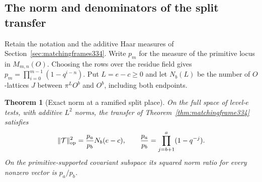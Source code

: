 \documentclass[a4paper,11pt]{article}
\newtheorem{theorem}[proposition]{Theorem}
\theoremstyle{definition}
\theoremstyle{remark}
\numberwithin{equation}{section}
\begin{document}
\subsection{The norm and denominators of the split transfer}\label{sec:mixedfourier334}

Retain the notation and the additive Haar measures of
Section~\ref{sec:matchingframes334}. Write \(p_m\) for the measure of
the primitive locus in \(M_{m,n}(O)\). Choosing the rows over the
residue field gives \(p_m=\prod_{i=0}^{m-1}(1-q^{i-n})\).
Put \(L=e-c\ge0\) and let \(N_b(L)\) be the number of \(O\)-lattices
\(J\) between \(\pi^L O^b\) and \(O^b\), including both endpoints.

\begin{theorem}[Exact norm at a ramified split place]\label{thm:frameoperator334}
On the full space of level-\(e\) tests, with additive \(L^2\) norms,
the transfer of Theorem~\ref{thm:matchingframe334} satisfies
\[
       \|\mathcal T\|_{\rm op}^2
       =\frac{p_a}{p_b}N_b(e-c),\qquad
       \frac{p_a}{p_b}=\prod_{j=b+1}^{a}(1-q^{-j}).
\]
On the primitive-supported covariant subspace its squared norm ratio
for every nonzero vector is \(p_a/p_b\).
\end{theorem}
\end{document}
